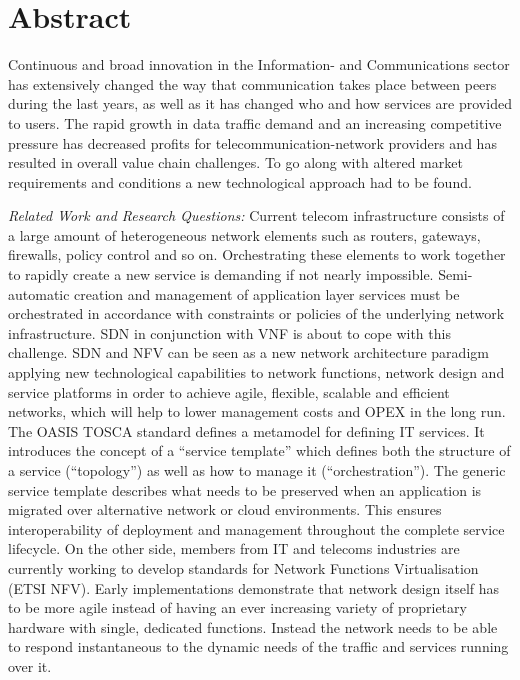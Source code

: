 \chapter*{Abstract}\label{sec:abstract}


Continuous and broad innovation in the Information- and Communications sector has extensively changed the way that communication takes place between peers during the last years, as well as it has changed who and how services are provided to users. The rapid growth in data traffic demand and an increasing competitive pressure has decreased profits for telecommunication-network providers and has resulted in overall value chain challenges.
To go along with altered market requirements and conditions a new technological approach had to be found.

\textit{Related Work and Research Questions:}
Current telecom infrastructure consists of a large amount of heterogeneous network elements such as routers, gateways, firewalls, policy control and so on. Orchestrating these elements to work together to rapidly create a new service is demanding if not nearly impossible. Semi-automatic creation and management of application layer services must be orchestrated in accordance with constraints or policies of the underlying network infrastructure. 
SDN in conjunction with VNF is about to cope with this challenge. SDN and NFV can be seen as a new network architecture paradigm applying new technological capabilities to network functions, network design and service platforms in order to achieve agile, flexible, scalable and efficient networks, which will help to lower management costs and OPEX in the long run.  
The OASIS TOSCA standard defines a metamodel for defining IT services. It introduces the concept of a “service template” which defines both the structure of a service (“topology”) as well as how to manage it (“orchestration”). The generic service template describes what needs to be preserved when an application is migrated over alternative network or cloud environments. This ensures interoperability of deployment and management throughout the complete service lifecycle.
On the other side, members from IT and telecoms industries are currently working to develop standards for Network Functions Virtualisation (ETSI NFV). Early implementations demonstrate that network design itself has to be more agile instead of having an ever increasing variety of proprietary hardware with single, dedicated functions. Instead the network needs to be able to respond instantaneous to the dynamic needs of the traffic and services running over it. 

